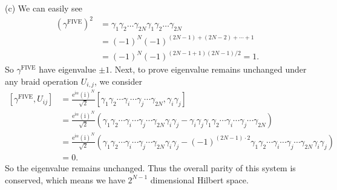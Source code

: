 \documentclass{book}
\begin{document}
(c) We can easily see
\begin{equation*}
\begin{aligned}
(\gamma ^{\mathrm{FIVE}} )^{2} & =\gamma _{1} \gamma _{2} \dotsc \gamma _{2N} \gamma _{1} \gamma _{2} \dotsc \gamma _{2N}\\
 & =( -1)^{N}( -1)^{( 2N-1) +( 2N-2) +\cdots +1}\\
 & =( -1)^{N}( -1)^{( 2N-1+1)( 2N-1) /2} =1.
\end{aligned}
\end{equation*}
So $\gamma ^{\mathrm{FIVE}}$ have eigenvalue $\pm 1$. Next, to prove eigenvalue remains unchanged under any braid operation $U_{i,j}$, we consider
\begin{equation*}
\begin{aligned}
[\gamma ^{\mathrm{FIVE}} ,U_{ij} ] & =\frac{\mathrm{e}^{\mathrm{i} \alpha }(\mathrm{i})^{N}}{\sqrt{2}} [\gamma _{1} \gamma _{2} \cdots \gamma _{i} \cdots \gamma _{j} \cdots \gamma _{2N} ,\gamma _{i} \gamma _{j} ]\\
 & =\frac{\mathrm{e}^{\mathrm{i} \alpha }(\mathrm{i})^{N}}{\sqrt{2}}( \gamma _{1} \gamma _{2} \cdots \gamma _{i} \cdots \gamma _{j} \cdots \gamma _{2N} \gamma _{i} \gamma _{j} -\gamma _{i} \gamma _{j} \gamma _{1} \gamma _{2} \cdots \gamma _{i} \cdots \gamma _{j} \cdots \gamma _{2N})\\
 & =\frac{\mathrm{e}^{\mathrm{i} \alpha }(\mathrm{i})^{N}}{\sqrt{2}} (\gamma _{1} \gamma _{2} \cdots \gamma _{i} \cdots \gamma _{j} \cdots \gamma _{2N} \gamma _{i} \gamma _{j} -( -1)^{( 2N-1) \cdot 2} \gamma _{1} \gamma _{2} \cdots \gamma _{i} \cdots \gamma _{j} \cdots \gamma _{2N} \gamma _{i} \gamma _{j} )\\
 & =0.
\end{aligned}
\end{equation*}
So the eigenvalue remains unchanged. Thus the overall parity of this system is conserved, which means we have $2^{N-1}$ dimensional Hilbert space. 
\end{document}
